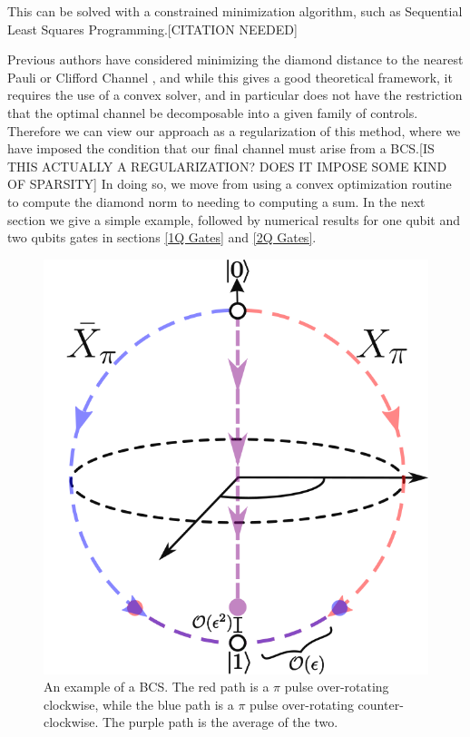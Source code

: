 \documentclass[aps,nofootinbib,pra,notitlepage,twocolumn]{revtex4-1}
\begin{document}
This can be solved with a constrained minimization algorithm, such as Sequential Least Squares Programming.[CITATION NEEDED]

Previous authors have considered minimizing the diamond distance to the nearest Pauli or Clifford Channel \cite{Magesan2013}, and while this gives a good theoretical framework, it requires the use of a convex solver, and in particular does not have the restriction that the optimal channel be decomposable into a given family of controls. Therefore we can view our approach as a regularization of this method, where we have imposed the condition that our final channel must arise from a BCS.[IS THIS ACTUALLY A REGULARIZATION? DOES IT IMPOSE SOME KIND OF SPARSITY] In doing so, we move from using a convex optimization routine to compute the diamond norm to needing to computing a sum. In the next section we give a simple example, followed by numerical results for one qubit and two qubits gates in sections \ref{1Q Gates} and \ref{2Q Gates}.

\begin{figure}
  \centering
  \includegraphics[width=.75\columnwidth]{simple_example.png}
  \caption{An example of a BCS. The red path is a $\pi$ pulse over-rotating clockwise, while the blue path is a $\pi$ pulse over-rotating counter-clockwise. The purple path is the average of the two.}
  \label{fig:simple_example}
\end{figure}
\end{document}
